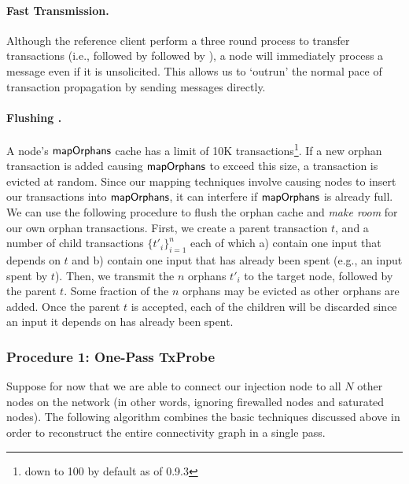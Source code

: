\paragraph{Fast Transmission.}
Although the reference client perform a three round process to transfer transactions (i.e.,  followed by  followed by ),
a node will immediately process a  message even if it is unsolicited.
This allows us to `outrun' the normal pace of transaction propagation by 
sending  messages directly.

\paragraph{Flushing .}
A node's $\textnormal{\textsf{{mapOrphans}}}$ cache has a limit of 10K transactions\footnote{down to 100 by default as of 0.9.3}. If a new orphan transaction is added causing $\textnormal{\textsf{{mapOrphans}}}$ to exceed this size, a transaction is evicted at random. Since our mapping techniques involve causing nodes to insert our transactions into $\textnormal{\textsf{{mapOrphans}}}$, it can interfere if $\textnormal{\textsf{{mapOrphans}}}$ is already full. We can use the following procedure to flush the orphan cache and \emph{make room} for our own orphan transactions. First, we create a parent transaction $t$, and a number of child transactions $\{t'_i\}_{i=1}^n$ each of which a) contain one input that depends on $t$ and b) contain one input that has already been spent (e.g., an input spent by $t$). Then, we transmit the $n$ orphans $t'_i$ to the target node, followed by the parent $t$. Some fraction of the $n$ orphans may be evicted as other orphans are added. Once the parent $t$ is accepted, each of the children will be discarded since an input it depends on has already been spent.



\subsubsection{Procedure 1: One-Pass TxProbe}
Suppose for now that we are able to connect our injection node to all $N$ other nodes on the network (in other words, ignoring firewalled nodes and saturated nodes). The following algorithm combines the basic techniques discussed above in order to reconstruct the entire connectivity graph in a single pass.

